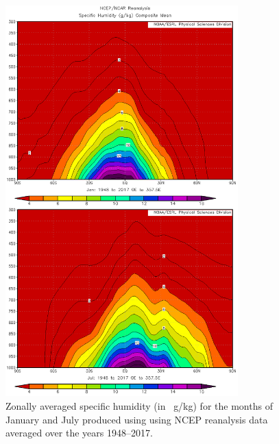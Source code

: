 \documentclass[11pt]{article}
\begin{document}
\begin{figure}[h!]
  \centering
  \includegraphics[width=0.8\textwidth]{qstar_janjul.png}
  \caption{Zonally averaged specific humidity (in \SI{}{\g/\kg}) for the months of January and July produced using using NCEP reanalysis data averaged over the years 1948--2017.}
  \label{fig:qstar}
\end{figure}
\end{document}
